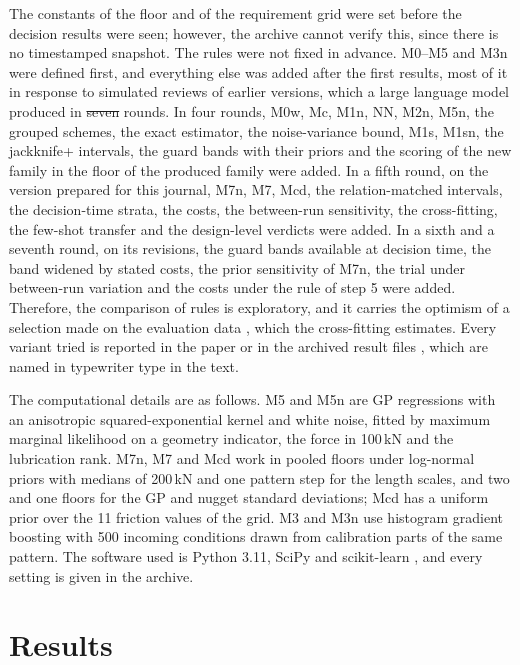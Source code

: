 \documentclass[pdflatex,sn-basic,lineno]{sn-jnl}
\providecommand{\DIFadd}[1]{{\protect\color{blue}\uwave{#1}}} %
\providecommand{\DIFdel}[1]{{\protect\color{red}\sout{#1}}}                      %
\providecommand{\DIFaddbegin}{} %
\providecommand{\DIFaddend}{} %
\providecommand{\DIFdelbegin}{} %
\providecommand{\DIFdelend}{} %
\newcommand{\DIFscaledelfig}{0.5}
\newlength{\DIFdelgraphicswidth} %
\newlength{\DIFdelgraphicsheight} %
\newcommand{\DIFaddincludegraphics}[2][]{{\color{blue}\fbox{\DIFOincludegraphics[#1]{#2}}}} %
\newcommand{\DIFdelincludegraphics}[2][]{%
\sbox{\DIFdelgraphicsbox}{\DIFOincludegraphics[#1]{#2}}%
\settoboxwidth{\DIFdelgraphicswidth}{\DIFdelgraphicsbox} %
\settoboxtotalheight{\DIFdelgraphicsheight}{\DIFdelgraphicsbox} %
\scalebox{\DIFscaledelfig}{%
\parbox[b]{\DIFdelgraphicswidth}{\usebox{\DIFdelgraphicsbox}\\[-\baselineskip] \rule{\DIFdelgraphicswidth}{0em}}\llap{\resizebox{\DIFdelgraphicswidth}{\DIFdelgraphicsheight}{%
\setlength{\unitlength}{\DIFdelgraphicswidth}%
\begin{picture}(1,1)%
\thicklines\linethickness{2pt} %
{\color[rgb]{1,0,0}\put(0,0){\framebox(1,1){}}}%
{\color[rgb]{1,0,0}\put(0,0){\line( 1,1){1}}}%
{\color[rgb]{1,0,0}\put(0,1){\line(1,-1){1}}}%
\end{picture}%
}\hspace*{3pt}}} %
} %
\DeclareRobustCommand{\DIFaddbegin}{\DIFOaddbegin \let\includegraphics\DIFaddincludegraphics} %
\DeclareRobustCommand{\DIFaddend}{\DIFOaddend \let\includegraphics\DIFOincludegraphics} %
\DeclareRobustCommand{\DIFdelbegin}{\DIFOdelbegin \let\includegraphics\DIFdelincludegraphics} %
\DeclareRobustCommand{\DIFdelend}{\DIFOaddend \let\includegraphics\DIFOincludegraphics} %
\begin{document}
The constants of the floor and of the requirement grid were set before the decision results were seen; however, the archive cannot verify this, since there is no timestamped snapshot. The rules were not fixed in advance. M0--M5 and M3n were defined first, and everything else was added after the first results, most of it in response to simulated reviews of earlier versions, which a large language model produced in \DIFdelbegin \DIFdel{seven }\DIFdelend \DIFaddbegin \DIFadd{eight }\DIFaddend rounds. In four rounds, M0w, Mc, M1n, NN, M2n, M5n, the grouped schemes, the exact estimator, the noise-variance bound, M1s, M1sn, the jackknife+ intervals, the guard bands with their priors and the scoring of the new family in the floor of the produced family were added. In a fifth round, on the version prepared for this journal, M7n, M7, Mcd, the relation-matched intervals, the decision-time strata, the costs, the between-run sensitivity, the cross-fitting, the few-shot transfer and the design-level verdicts were added. In a sixth and a seventh round, on its revisions, the guard bands available at decision time, the band widened by stated costs, the prior sensitivity of M7n, the trial under between-run variation and the costs under the rule of step 5 were added\DIFaddbegin \DIFadd{; the eighth added no analysis}\DIFaddend . Therefore, the comparison of rules is exploratory, and it carries the optimism of a selection made on the evaluation data \citep{cawley2010over, varma2006bias}, which the cross-fitting estimates. Every variant tried is reported in the paper or in the archived result files \citep{canseven2026archive}, which are named in typewriter type in the text.

The computational details are as follows. M5 and M5n are GP regressions with an anisotropic squared-exponential kernel and white noise, fitted by maximum marginal likelihood on a geometry indicator, the force in 100\,kN and the lubrication rank. M7n, M7 and Mcd work in pooled floors under log-normal priors with medians of 200\,kN and one pattern step for the length scales, and two and one floors for the GP and nugget standard deviations; Mcd has a uniform prior over the 11 friction values of the grid. M3 and M3n use histogram gradient boosting with 500 incoming conditions drawn from calibration parts of the same pattern. The software used is Python 3.11, SciPy and scikit-learn \citep{pedregosa2011scikit}, and every setting is given in the archive.

\section{Results}\label{sec:results}
\end{document}
